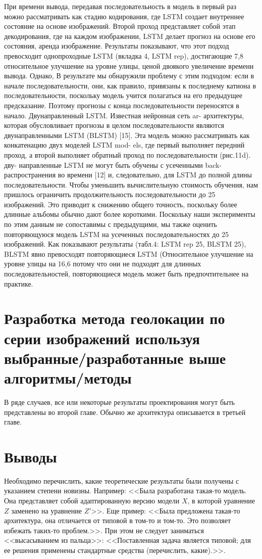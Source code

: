При времени вывода, передавая последовательность в модель
в первый раз можно рассматривать как стадию кодирования, где
LSTM создает внутреннее состояние на основе изображений.
Второй проход представляет собой этап декодирования, где на каждом изображении,
LSTM делает прогноз на основе его состояния,
аренда изображение. Результаты показывают, что этот подход превосходит
однопроходные LSTM (вкладка 4, LSTM rep), достигающие 7,8%
относительное улучшение на уровне улицы, ценой двоякого
увеличение времени вывода. Однако,
В результате мы обнаружили проблему с этим подходом:
если в начале
последовательности, они, как правило, привязаны к последнему
катиона в последовательности, поскольку модель учится полагаться на
его предыдущее предсказание. Поэтому прогнозы с конца
последовательности переносятся в начало.
Двунаправленный LSTM. Известная нейронная сеть ar-
архитектуры, которая обусловливает прогнозы в целом
последовательности являются двунаправленными LSTM (BLSTM) [15]. Эта
модель можно рассматривать как конкатенацию двух моделей LSTM mod-
els, где первый выполняет передний проход, а второй выполняет обратный проход по последовательности (рис.11d). дву-
направленные LSTM не могут быть обучены с усеченными back-
распространения во времени [12] и, следовательно, для
LSTM до полной длины последовательности. Чтобы уменьшить
вычислительную стоимость обучения, нам пришлось ограничить продолжительность
последовательности до 25 изображений. Это приводит к снижению общего
точность, поскольку более длинные альбомы обычно дают
более короткими. Поскольку наши эксперименты по этим данным
не сопоставимы с предыдущими, мы также
оценить повторяющуюся модель LSTM на усеченных последовательностях
до 25 изображений. Как показывают результаты (табл.4: LSTM rep 25,
BLSTM 25), BLSTM явно превосходят повторяющиеся LSTM
(Относительное улучшение на уровне улицы на 16,6%
потому что они не подходят для длинных последовательностей, повторяющиеся
модель может быть предпочтительнее на практике.


\section{Разработка метода геолокации по серии изображений используя выбранные/разработанные выше алгоритмы/методы}

В ряде случаев, все или некоторые результаты проектирования могут быть представлены во второй главе. Обычно же архитектура описывается в третьей главе.

\section{Выводы}

Необходимо перечислить, какие теоретические результаты были получены с 
указанием степени новизны. Например: <<Была разработана такая-то модель. Она 
представляет собой адаптированную версию модели $X$, в которой уравнение $Z$ 
заменено на уравнение $Z'$>>. Еще пример: <<Была предложена такая-то 
архитектура, она отличается от типовой в том-то и том-то. Это позволяет 
избежать таких-то проблем.>>. При этом не следует заниматься <<высасыванием из 
пальца>>: <<Поставленная задача является типовой; для ее решения применены 
стандартные средства (перечислить, какие).>>.

